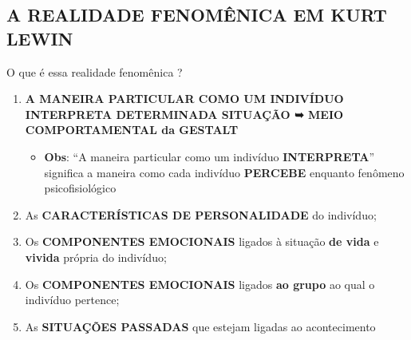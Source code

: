 \documentclass[
]{book}
\providecommand{\tightlist}{%
  \setlength{\itemsep}{0pt}\setlength{\parskip}{0pt}}
\begin{document}
\hypertarget{a-realidade-fenomuxeanica-em-kurt-lewin}{%
\subsection{A REALIDADE FENOMÊNICA EM KURT LEWIN}\label{a-realidade-fenomuxeanica-em-kurt-lewin}}

O que é essa realidade fenomênica ?

\begin{enumerate}
\def\labelenumi{\arabic{enumi}.}
\tightlist
\item
  \textbf{A MANEIRA PARTICULAR COMO UM INDIVÍDUO INTERPRETA DETERMINADA SITUAÇÃO ➥ MEIO COMPORTAMENTAL da GESTALT}

  \begin{itemize}
  \tightlist
  \item
    \textbf{Obs}: ``A maneira particular como um indivíduo \textbf{INTERPRETA}'' significa a maneira como cada indivíduo \textbf{PERCEBE} enquanto fenômeno psicofisiológico
  \end{itemize}
\item
  As \textbf{CARACTERÍSTICAS DE PERSONALIDADE} do indivíduo;
\item
  Os \textbf{COMPONENTES EMOCIONAIS} ligados à situação \textbf{de vida} e \textbf{vivida} própria do indivíduo;
\item
  Os \textbf{COMPONENTES EMOCIONAIS} ligados \textbf{ao grupo} ao qual o indivíduo pertence;
\item
  As \textbf{SITUAÇÕES PASSADAS} que estejam ligadas ao acontecimento
\end{enumerate}
\end{document}
